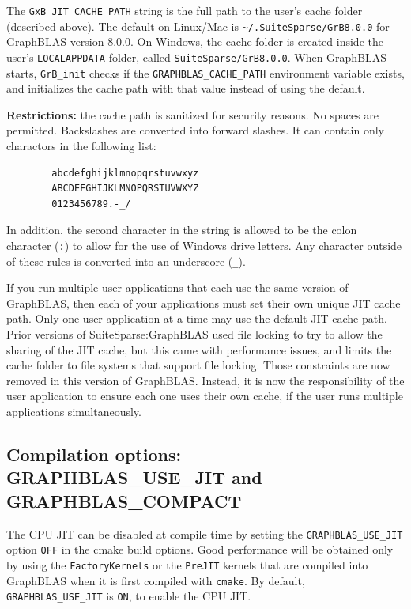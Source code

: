 The \verb'GxB_JIT_CACHE_PATH' string is the full path to the user's cache
folder (described above).  The default on Linux/Mac is
\verb'~/.SuiteSparse/GrB8.0.0' for GraphBLAS version 8.0.0.  On Windows,
the cache folder is created inside the user's \verb'LOCALAPPDATA' folder,
called \verb'SuiteSparse/GrB8.0.0'.  When GraphBLAS starts,
\verb'GrB_init' checks if the \verb'GRAPHBLAS_CACHE_PATH' environment variable
exists, and initializes the cache path with that value instead of using the
default.

{\bf Restrictions:} the cache path is sanitized for security reasons.  No spaces
are permitted.  Backslashes are converted into forward slashes.  It can contain
only charactors in the following list:

\begin{verbatim}
        abcdefghijklmnopqrstuvwxyz
        ABCDEFGHIJKLMNOPQRSTUVWXYZ
        0123456789.-_/
\end{verbatim}

In addition, the second character in the string is allowed to be the colon
character (\verb':') to allow for the use of Windows drive letters.  Any
character outside of these rules is converted into an underscore (\verb'_').

If you run multiple user applications that each use the same version of
GraphBLAS, then each of your applications must set their own unique JIT cache
path.  Only one user application at a time may use the default JIT cache path.
Prior versions of SuiteSparse:GraphBLAS used file locking to try to allow the
sharing of the JIT cache, but this came with performance issues, and limits the
cache folder to file systems that support file locking.  Those constraints are
now removed in this version of GraphBLAS.  Instead, it is now the
responsibility of the user application to ensure each one uses their own cache,
if the user runs multiple applications simultaneously.

\subsection{Compilation options: {\sf GRAPHBLAS\_USE\_JIT} and {\sf GRAPHBLAS\_COMPACT}}

The CPU JIT can be disabled at compile time by setting the
\verb'GRAPHBLAS_USE_JIT' option \verb'OFF' in the cmake build options.  Good
performance will be obtained only by using the \verb'FactoryKernels' or the
\verb'PreJIT' kernels that are compiled into GraphBLAS when it is first
compiled with \verb'cmake'.  By default, \verb'GRAPHBLAS_USE_JIT' is \verb'ON',
to enable the CPU JIT.


